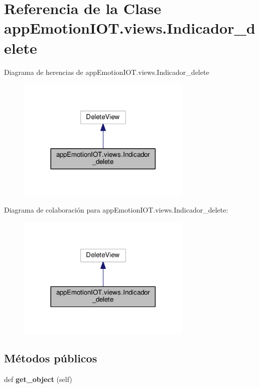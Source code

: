 \hypertarget{classappEmotionIOT_1_1views_1_1Indicador__delete}{}\section{Referencia de la Clase app\+Emotion\+I\+O\+T.\+views.\+Indicador\+\_\+delete}
\label{classappEmotionIOT_1_1views_1_1Indicador__delete}


Diagrama de herencias de app\+Emotion\+I\+O\+T.\+views.\+Indicador\+\_\+delete
\nopagebreak
\begin{figure}[H]
\begin{center}
\leavevmode
\includegraphics[width=236pt]{classappEmotionIOT_1_1views_1_1Indicador__delete__inherit__graph}
\end{center}
\end{figure}


Diagrama de colaboración para app\+Emotion\+I\+O\+T.\+views.\+Indicador\+\_\+delete\+:
\nopagebreak
\begin{figure}[H]
\begin{center}
\leavevmode
\includegraphics[width=236pt]{classappEmotionIOT_1_1views_1_1Indicador__delete__coll__graph}
\end{center}
\end{figure}
\subsection*{Métodos públicos}
\begin{DoxyCompactItemize}
\item 
def {\bfseries get\+\_\+object} (self)\hypertarget{classappEmotionIOT_1_1views_1_1Indicador__delete_a984d46810f085c393d86279f3111cf0f}{}\label{classappEmotionIOT_1_1views_1_1Indicador__delete_a984d46810f085c393d86279f3111cf0f}

\end{DoxyCompactItemize}
